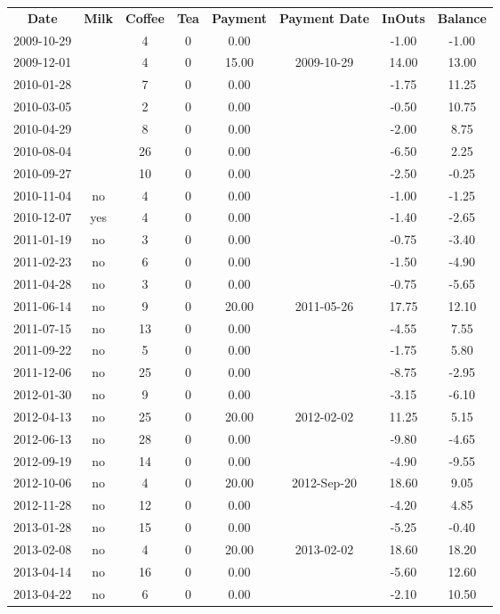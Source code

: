 \begin{center}
\begin{tabular}{cccccccc}
\textbf{Date} & \textbf{Milk} & \textbf{Coffee} & \textbf{Tea} & \textbf{Payment} & \textbf{Payment Date} & \textbf{InOuts} & \textbf{Balance} \\
2009-10-29 &  &  4 & 0 &  0.00 &  & -1.00 & -1.00\\ 
2009-12-01 &  &  4 & 0 & 15.00 & 2009-10-29 & 14.00 & 13.00\\ 
2010-01-28 &  &  7 & 0 &  0.00 &  & -1.75 & 11.25\\ 
2010-03-05 &  &  2 & 0 &  0.00 &  & -0.50 & 10.75\\ 
2010-04-29 &  &  8 & 0 &  0.00 &  & -2.00 &  8.75\\ 
2010-08-04 &  & 26 & 0 &  0.00 &  & -6.50 &  2.25\\ 
2010-09-27 &  & 10 & 0 &  0.00 &  & -2.50 & -0.25\\ 
2010-11-04 & no &  4 & 0 &  0.00 &  & -1.00 & -1.25\\ 
2010-12-07 & yes &  4 & 0 &  0.00 &  & -1.40 & -2.65\\ 
2011-01-19 & no &  3 & 0 &  0.00 &  & -0.75 & -3.40\\ 
2011-02-23 & no &  6 & 0 &  0.00 &  & -1.50 & -4.90\\ 
2011-04-28 & no &  3 & 0 &  0.00 &  & -0.75 & -5.65\\ 
2011-06-14 & no &  9 & 0 & 20.00 & 2011-05-26 & 17.75 & 12.10\\ 
2011-07-15 & no & 13 & 0 &  0.00 &  & -4.55 &  7.55\\ 
2011-09-22 & no &  5 & 0 &  0.00 &  & -1.75 &  5.80\\ 
2011-12-06 & no & 25 & 0 &  0.00 &  & -8.75 & -2.95\\ 
2012-01-30 & no &  9 & 0 &  0.00 &  & -3.15 & -6.10\\ 
2012-04-13 & no & 25 & 0 & 20.00 & 2012-02-02 & 11.25 &  5.15\\ 
2012-06-13 & no & 28 & 0 &  0.00 &  & -9.80 & -4.65\\ 
2012-09-19 & no & 14 & 0 &  0.00 &  & -4.90 & -9.55\\ 
2012-10-06 & no &  4 & 0 & 20.00 & 2012-Sep-20 & 18.60 &  9.05\\ 
2012-11-28 & no & 12 & 0 &  0.00 &  & -4.20 &  4.85\\ 
2013-01-28 & no & 15 & 0 &  0.00 &  & -5.25 & -0.40\\ 
2013-02-08 & no &  4 & 0 & 20.00 & 2013-02-02 & 18.60 & 18.20\\ 
2013-04-14 & no & 16 & 0 &  0.00 &  & -5.60 & 12.60\\ 
2013-04-22 & no &  6 & 0 &  0.00 &  & -2.10 & 10.50
\end{tabular}
\end{center}

